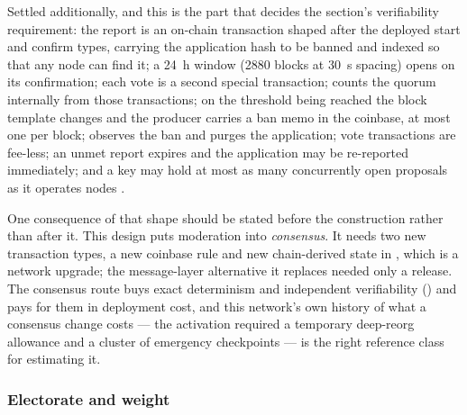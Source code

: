 Settled additionally, and this is the part that decides the section's verifiability requirement:
the report is an on-chain transaction shaped after the deployed \FluxNode{} start and confirm
types, carrying the application hash to be banned and indexed so that any node can find it; a
\SI{24}{\hour} window (\num{2880} blocks at \SI{30}{\second} spacing) opens on its confirmation;
each vote is a second special transaction; \fluxd{} counts the quorum internally from those
transactions; on the threshold being reached the block template changes and the \PoN{} producer
carries a ban memo in the coinbase, at most one per block; \FluxOS{} observes the ban and purges
the application; vote transactions are fee-less; an unmet report expires and the application may be
re-reported immediately; and a key may hold at most as many concurrently open proposals as it
operates nodes .

One consequence of that shape should be stated before the construction rather than after it. This
design puts moderation into \emph{consensus}. It needs two new transaction types, a new coinbase
rule and new chain-derived state in \fluxd, which is a network upgrade; the message-layer
alternative it replaces needed only a \FluxOS{} release. The consensus route buys exact
determinism and independent verifiability () and pays for them in
deployment cost, and this network's own history of what a consensus change costs --- the \PoN{}
activation required a temporary deep-reorg allowance and a cluster of emergency checkpoints
  --- is the
right reference class for estimating it.

\subsubsection{Electorate and weight}

